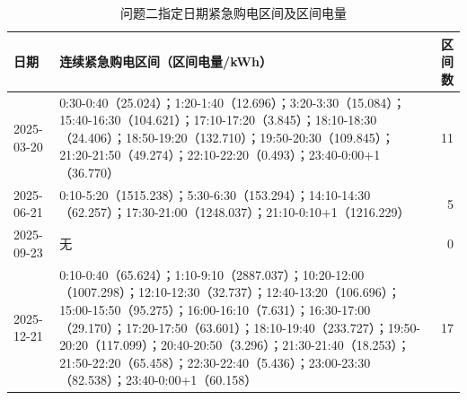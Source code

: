 \documentclass[UTF8,12pt,a4paper]{ctexart}
\begin{document}
\begin{table}[H]\centering\scriptsize\caption{问题二指定日期紧急购电区间及区间电量}\label{tab:q2emg_detail}
\begin{tabular}{lp{.64\linewidth}r}\toprule 日期&连续紧急购电区间（区间电量/kWh）&区间数\\\midrule
2025-03-20&0:30-0:40（25.024）；1:20-1:40（12.696）；3:20-3:30（15.084）；15:40-16:30（104.621）；17:10-17:20（3.845）；18:10-18:30（24.406）；18:50-19:20（132.710）；19:50-20:30（109.845）；21:20-21:50（49.274）；22:10-22:20（0.493）；23:40-0:00+1（36.770）&11\\
2025-06-21&0:10-5:20（1515.238）；5:30-6:30（153.294）；14:10-14:30（62.257）；17:30-21:00（1248.037）；21:10-0:10+1（1216.229）&5\\
2025-09-23&无&0\\
2025-12-21&0:10-0:40（65.624）；1:10-9:10（2887.037）；10:20-12:00（1007.298）；12:10-12:30（32.737）；12:40-13:20（106.696）；15:00-15:50（95.275）；16:00-16:10（7.631）；16:30-17:00（29.170）；17:20-17:50（63.601）；18:10-19:40（233.727）；19:50-20:20（117.099）；20:40-20:50（3.296）；21:30-21:40（18.253）；21:50-22:20（65.458）；22:30-22:40（5.436）；23:00-23:30（82.538）；23:40-0:00+1（60.158）&17\\
\bottomrule\end{tabular}\end{table}
\end{document}
